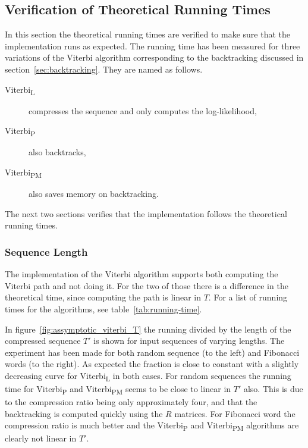 \subsection{Verification of Theoretical Running Times}
\label{sec:theor-runn-times}

In this section the theoretical running times are verified to make sure that
the implementation runs as expected. The running time has been measured for
three variations of the Viterbi algorithm corresponding to the backtracking
discussed in section~\ref{sec:backtracking}. They are named as follows.
\begin{description}
\item[Viterbi\textsubscript{L}] compresses the sequence and only computes the
  log-likelihood,
\item[Viterbi\textsubscript{P}] also backtracks,
\item[Viterbi\textsubscript{PM}] also saves memory on backtracking.
\end{description}
The next two sections verifies that the implementation follows the theoretical
running times.

\subsubsection{Sequence Length}

The implementation of the Viterbi algorithm supports both computing the Viterbi
path and not doing it. For the two of those there is a difference in the
theoretical time, since computing the path is linear in $T$. For a list of
running times for the algorithms, see table~\ref{tab:running-time}.

In figure~\ref{fig:assymptotic_viterbi_T} the running divided by the length of
the compressed sequence $T'$ is shown for input sequences of varying lengths.
The experiment has been made for both random sequence (to the left) and
Fibonacci words (to the right). As expected the fraction is close to constant
with a slightly decreasing curve for Viterbi\textsubscript{L} in both cases.
For random sequences the running time for Viterbi\textsubscript{P} and
Viterbi\textsubscript{PM} seems to be close to linear in $T'$
also. This is due
to the compression ratio being only approximately four, and that the
backtracking is computed quickly using the $R$ matrices. For Fibonacci word the
compression ratio is much better and the Viterbi\textsubscript{P} and
Viterbi\textsubscript{PM} algorithms are clearly not linear in $T'$.

